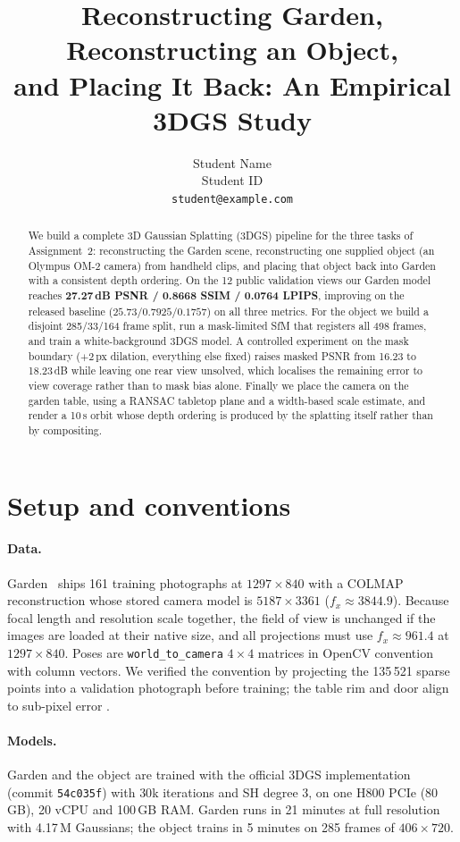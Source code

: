 \documentclass[10pt,twocolumn,letterpaper]{article}
\title{Reconstructing Garden, Reconstructing an Object,\\and Placing It Back: An Empirical 3DGS Study}
\author{Student Name\\
Student ID\\
\tt\small student@example.com}
\begin{document}
\maketitle

\begin{abstract}
We build a complete 3D Gaussian Splatting (3DGS) pipeline for the three tasks of Assignment~2:
reconstructing the Garden scene, reconstructing one supplied object (an Olympus OM-2 camera)
from handheld clips, and placing that object back into Garden with a consistent depth ordering.
On the 12 public validation views our Garden model reaches \textbf{27.27\,dB PSNR / 0.8668 SSIM /
0.0764 LPIPS}, improving on the released baseline ($25.73 / 0.7925 / 0.1757$) on all three
metrics. For the object we build a disjoint 285/33/164 frame split, run a mask-limited SfM
that registers all 498 frames, and train a white-background 3DGS model. A controlled experiment
on the mask boundary ($+2$\,px dilation, everything else fixed) raises masked PSNR from
16.23 to 18.23\,dB while leaving one rear view unsolved, which localises the remaining error to
view coverage rather than to mask bias alone. Finally we place the camera on the garden table,
using a RANSAC tabletop plane and a width-based scale estimate, and render a 10\,s orbit whose
depth ordering is produced by the splatting itself rather than by compositing.
\end{abstract}

\section{Setup and conventions}

\paragraph{Data.} Garden~\cite{barron2022} ships 161 training photographs at $1297\times840$ with a COLMAP
reconstruction whose stored camera model is $5187\times3361$ ($f_x\!\approx\!3844.9$).
Because focal length and resolution scale together, the field of view is unchanged if the images
are loaded at their native size, and all projections must use $f_x\!\approx\!961.4$ at
$1297\times840$. Poses are \texttt{world\_to\_camera} $4\times4$ matrices in OpenCV convention
with column vectors. We verified the convention by projecting the 135\,521 sparse points into a
validation photograph before training; the table rim and door align to sub-pixel error
.

\paragraph{Models.} Garden and the object are trained with the official 3DGS implementation~\cite{kerbl2023}
(commit \texttt{54c035f}) with $30$k iterations and SH degree 3, on one H800 PCIe (80\,GB),
20 vCPU and 100\,GB RAM. Garden runs in 21 minutes at full resolution with 4.17\,M Gaussians;
the object trains in 5 minutes on 285 frames of $406\times720$.
\end{document}
